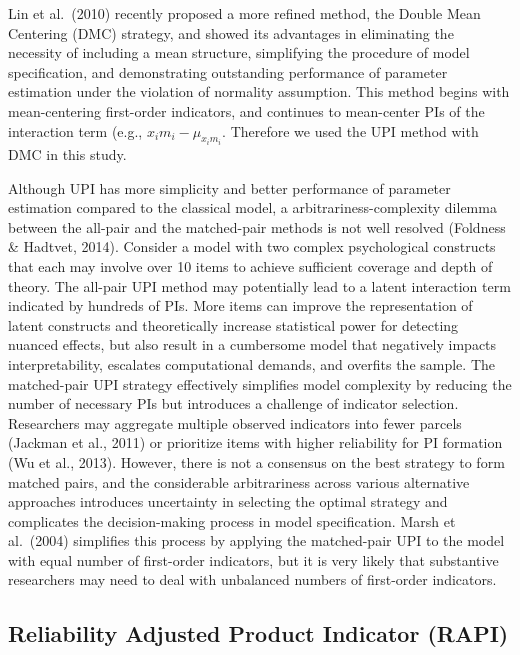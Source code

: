 \documentclass[
  man]{apa6}
\begin{document}
Lin et al.~(2010) recently proposed a more refined method, the Double Mean Centering (DMC) strategy, and showed its advantages in eliminating the necessity of including a mean structure, simplifying the procedure of model specification, and demonstrating outstanding performance of parameter estimation under the violation of normality assumption. This method begins with mean-centering first-order indicators, and continues to mean-center PIs of the interaction term (e.g., \(x_{i}m_{i} - \mu_{x_{i}m_{i}}\). Therefore we used the UPI method with DMC in this study.

Although UPI has more simplicity and better performance of parameter estimation compared to the classical model, a arbitrariness-complexity dilemma between the all-pair and the matched-pair methods is not well resolved (Foldness \& Hadtvet, 2014). Consider a model with two complex psychological constructs that each may involve over 10 items to achieve sufficient coverage and depth of theory. The all-pair UPI method may potentially lead to a latent interaction term indicated by hundreds of PIs. More items can improve the representation of latent constructs and theoretically increase statistical power for detecting nuanced effects, but also result in a cumbersome model that negatively impacts interpretability, escalates computational demands, and overfits the sample. The matched-pair UPI strategy effectively simplifies model complexity by reducing the number of necessary PIs but introduces a challenge of indicator selection. Researchers may aggregate multiple observed indicators into fewer parcels (Jackman et al., 2011) or prioritize items with higher reliability for PI formation (Wu et al., 2013). However, there is not a consensus on the best strategy to form matched pairs, and the considerable arbitrariness across various alternative approaches introduces uncertainty in selecting the optimal strategy and complicates the decision-making process in model specification. Marsh et al.~(2004) simplifies this process by applying the matched-pair UPI to the model with equal number of first-order indicators, but it is very likely that substantive researchers may need to deal with unbalanced numbers of first-order indicators.

\hypertarget{reliability-adjusted-product-indicator-rapi}{%
\subsection{Reliability Adjusted Product Indicator (RAPI)}\label{reliability-adjusted-product-indicator-rapi}}
\end{document}
